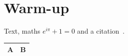 \documentclass[11pt,a4paper]{article}
\begin{document}
\section{Warm-up}
Text, maths $e^{i\pi}+1=0$ and a citation~\cite{knuth1984}.
\begin{tabularx}{\linewidth}{|l|X|}
\hline
A & B \\ \hline
\end{tabularx}


\end{document}
